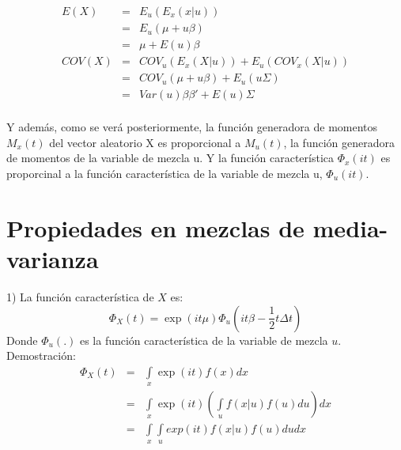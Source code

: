 \begin{eqnarray}
E(X)&=&E_{u}(E_{x}(x|u)) \nonumber\\
&=&E_{u}(\mu + u\beta)\nonumber\\
&=&\mu+E(u)\beta\nonumber\\
COV(X)&=&COV_{u}(E_{x}(X|u)) + E_{u}(COV_{x}(X|u)) \nonumber\\
&=&COV_{u}(\mu + u\beta) + E_{u}(u\Sigma) \nonumber\\
&=&Var(u)\beta \beta' + E(u)\Sigma \nonumber\\
\end{eqnarray}

Y además, como se verá posteriormente, la función generadora de momentos $M_{x}(t)$ del vector aleatorio X es proporcional a $M_{u}(t)$, la función generadora de momentos de la variable de mezcla u. Y la función característica $\Phi_{x}(it)$ es proporcinal a la función característica de la variable de mezcla u, $\Phi_{u}(it)$.\\


\section{Propiedades en mezclas de media-varianza}

1) La función característica de $X$ es: 
\begin{equation*}
\Phi_{X}(t)=\exp \left( it\mu\acute{} \right) \Phi_{u}(it\beta\acute{}-\frac{1}{2}t\Delta t\acute{}) 
\end{equation*}
Donde $\Phi_{u}(.)$ es la función característica de la variable de mezcla $u$. \\

Demostración:\\

\begin{eqnarray}
\Phi_{X}(t)&=&\underset{x}{\int }\exp(it)f(x)dx \nonumber\\
&=& \underset{x}{\int }\exp(it)(\underset{u}{\int}f(x|u)f(u)du)dx\nonumber\\
&=&\underset{x}{\int}\underset{u}{\int}exp(it)f(x|u)f(u)dudx\nonumber\\
\end{eqnarray}

